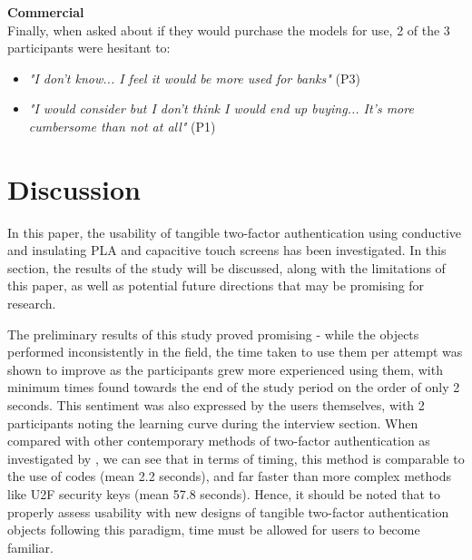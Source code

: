 \documentclass{l4proj}
\begin{document}
\textbf{Commercial}\\
Finally, when asked about if they would purchase the models for use, 2 of the 3 participants were hesitant to:
\begin{itemize}
    \item \textit{"I don't know... I feel it would be more used for banks"} (P3)
    \item \textit{"I would consider but I don't think I would end up buying... It's more cumbersome than not at all"} (P1)
\end{itemize}

\chapter{Discussion} 

In this paper, the usability of tangible two-factor authentication using conductive and insulating PLA and capacitive touch screens has been investigated. In this section, the results of the study will be discussed, along with the limitations of this paper, as well as potential future directions that may be promising for research.

The preliminary results of this study proved promising - while the objects performed inconsistently in the field, the time taken to use them per attempt was shown to improve as the participants grew more experienced using them, with minimum times found towards the end of the study period on the order of only 2 seconds. This sentiment was also expressed by the users themselves, with 2 participants noting the learning curve during the interview section. When compared with other contemporary methods of two-factor authentication as investigated by \cite{reese2019usability}, we can see that in terms of timing, this method is comparable to the use of codes (mean 2.2 seconds), and far faster than more complex methods like U2F security keys (mean 57.8 seconds). Hence, it should be noted that to properly assess usability with new designs of tangible two-factor authentication objects following this paradigm, time must be allowed for users to become familiar. 
\end{document}
